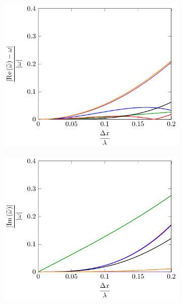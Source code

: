 \begin{figure}
	\centering
	\begin{subfigure}{0.5\textwidth}
		\includegraphics[width=\textwidth]{./chp4/figures/Dispu1khShallRez.pdf}
	\end{subfigure}%
	\begin{subfigure}{0.5\textwidth}
		\includegraphics[width=\textwidth]{./chp4/figures/Dispu1khShallImz.pdf}
	\end{subfigure}
	\par\bigskip

\end{figure}
